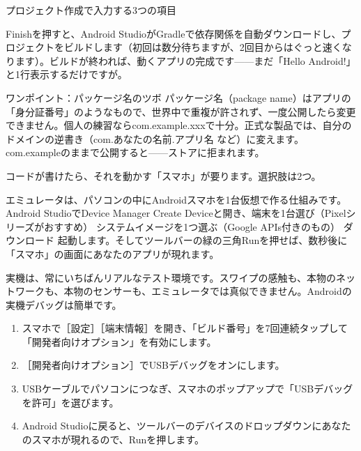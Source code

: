 \begin{center}\small\color{gray}プロジェクト作成で入力する3つの項目\end{center}

Finishを押すと、Android StudioがGradleで依存関係を自動ダウンロードし、プロジェクトをビルドします（初回は数分待ちますが、2回目からはぐっと速くなります）。ビルドが終われば、動くアプリの完成です——まだ「Hello Android!」と1行表示するだけですが。

\begin{tcbinfo}{ワンポイント：パッケージ名のツボ}
パッケージ名（package name）はアプリの「身分証番号」のようなもので、世界中で重複が許されず、一度公開したら変更できません。個人の練習ならcom.example.xxxで十分。正式な製品では、自分のドメインの逆書き（com.あなたの名前.アプリ名 など）に変えます。com.exampleのままで公開すると——ストアに拒まれます。

\end{tcbinfo}


コードが書けたら、それを動かす「スマホ」が要ります。選択肢は2つ。


エミュレータは、パソコンの中にAndroidスマホを1台仮想で作る仕組みです。Android StudioでDevice Manager Create Deviceと開き、端末を1台選び（Pixelシリーズがおすすめ） システムイメージを1つ選ぶ（Google APIs付きのもの） ダウンロード 起動します。そしてツールバーの緑の三角Runを押せば、数秒後に「スマホ」の画面にあなたのアプリが現れます。


実機は、常にいちばんリアルなテスト環境です。スワイプの感触も、本物のネットワークも、本物のセンサーも、エミュレータでは真似できません。Androidの実機デバッグは簡単です。

\begin{enumerate}
  \item スマホで［設定］［端末情報］を開き、「ビルド番号」を7回連続タップして「開発者向けオプション」を有効にします。
  \item ［開発者向けオプション］でUSBデバッグをオンにします。
  \item USBケーブルでパソコンにつなぎ、スマホのポップアップで「USBデバッグを許可」を選びます。
  \item Android Studioに戻ると、ツールバーのデバイスのドロップダウンにあなたのスマホが現れるので、Runを押します。
\end{enumerate}

